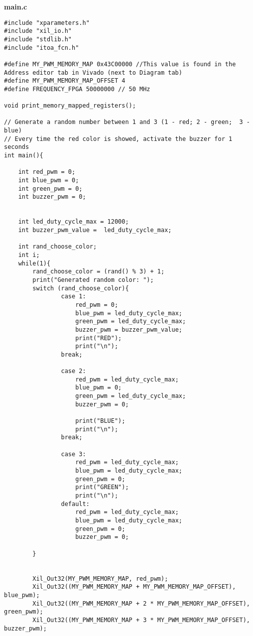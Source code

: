 \textbf{main.c}
\begin{verbatim}
#include "xparameters.h"
#include "xil_io.h"
#include "stdlib.h"
#include "itoa_fcn.h"

#define MY_PWM_MEMORY_MAP 0x43C00000 //This value is found in the Address editor tab in Vivado (next to Diagram tab)
#define MY_PWM_MEMORY_MAP_OFFSET 4
#define FREQUENCY_FPGA 50000000 // 50 MHz

void print_memory_mapped_registers();

// Generate a random number between 1 and 3 (1 - red; 2 - green;  3 - blue)
// Every time the red color is showed, activate the buzzer for 1 seconds
int main(){

    int red_pwm = 0;
    int blue_pwm = 0;
    int green_pwm = 0;
    int buzzer_pwm = 0;


    int led_duty_cycle_max = 12000;
    int buzzer_pwm_value =  led_duty_cycle_max;

    int rand_choose_color;
    int i;
    while(1){
        rand_choose_color = (rand() % 3) + 1;
        print("Generated random color: ");
        switch (rand_choose_color){
                case 1:
                    red_pwm = 0;
                    blue_pwm = led_duty_cycle_max;
                    green_pwm = led_duty_cycle_max;
                    buzzer_pwm = buzzer_pwm_value;
                    print("RED");
                    print("\n");
                break;

                case 2:
                    red_pwm = led_duty_cycle_max;
                    blue_pwm = 0;
                    green_pwm = led_duty_cycle_max;
                    buzzer_pwm = 0;

                    print("BLUE");
                    print("\n");
                break;

                case 3:
                    red_pwm = led_duty_cycle_max;
                    blue_pwm = led_duty_cycle_max;
                    green_pwm = 0;
                    print("GREEN");
                    print("\n");
                default:
                    red_pwm = led_duty_cycle_max;
                    blue_pwm = led_duty_cycle_max;
                    green_pwm = 0;
                    buzzer_pwm = 0;

        }


        Xil_Out32(MY_PWM_MEMORY_MAP, red_pwm);
        Xil_Out32((MY_PWM_MEMORY_MAP + MY_PWM_MEMORY_MAP_OFFSET), blue_pwm);
        Xil_Out32((MY_PWM_MEMORY_MAP + 2 * MY_PWM_MEMORY_MAP_OFFSET), green_pwm);
        Xil_Out32((MY_PWM_MEMORY_MAP + 3 * MY_PWM_MEMORY_MAP_OFFSET), buzzer_pwm);


\end{verbatim}
